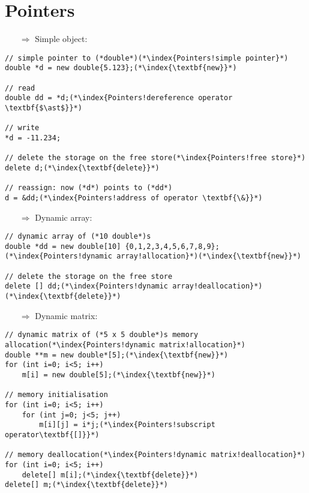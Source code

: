\documentclass[10pt]{article}
\begin{document}
\section{Pointers}
\small
\begin{enumerate}
\item[$\Rightarrow$] Simple object:
\end{enumerate}
\begin{lstlisting}
// simple pointer to (*double*)(*\index{Pointers!simple pointer}*)
double *d = new double{5.123};(*\index{\textbf{new}}*)

// read
double dd = *d;(*\index{Pointers!dereference operator \textbf{$\ast$}}*)

// write
*d = -11.234;

// delete the storage on the free store(*\index{Pointers!free store}*)
delete d;(*\index{\textbf{delete}}*)

// reassign: now (*d*) points to (*dd*)
d = &dd;(*\index{Pointers!address of operator \textbf{\&}}*)
\end{lstlisting}
\begin{enumerate}
\item[$\Rightarrow$] Dynamic array:
\end{enumerate}
\begin{lstlisting}
// dynamic array of (*10 double*)s
double *dd = new double[10] {0,1,2,3,4,5,6,7,8,9};(*\index{Pointers!dynamic array!allocation}*)(*\index{\textbf{new}}*)

// delete the storage on the free store
delete [] dd;(*\index{Pointers!dynamic array!deallocation}*)(*\index{\textbf{delete}}*)
\end{lstlisting}
\begin{enumerate}
\item[$\Rightarrow$] Dynamic matrix:
\end{enumerate}
\begin{lstlisting}
// dynamic matrix of (*5 x 5 double*)s memory allocation(*\index{Pointers!dynamic matrix!allocation}*)
double **m = new double*[5];(*\index{\textbf{new}}*)
for (int i=0; i<5; i++)
    m[i] = new double[5];(*\index{\textbf{new}}*)

// memory initialisation    
for (int i=0; i<5; i++)
    for (int j=0; j<5; j++)
        m[i][j] = i*j;(*\index{Pointers!subscript operator\textbf{[]}}*)

// memory deallocation(*\index{Pointers!dynamic matrix!deallocation}*)
for (int i=0; i<5; i++)
    delete[] m[i];(*\index{\textbf{delete}}*)
delete[] m;(*\index{\textbf{delete}}*)
\end{lstlisting}
%
%
\end{document}
